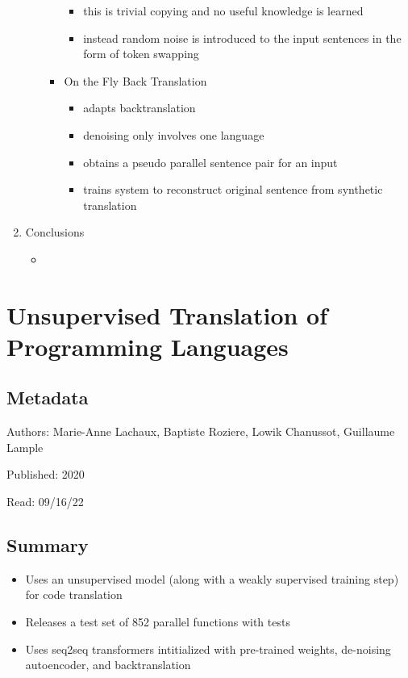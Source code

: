 \documentclass{article}
\begin{document}
\begin{enumerate}
\begin{enumerate}
\begin{itemize}
\begin{itemize}
				\item this is trivial copying and no useful knowledge is learned
				\item instead random noise is introduced to the input sentences in the form of token swapping
			\end{itemize}
			\item On the Fly Back Translation
			\begin{itemize}
				\item adapts backtranslation
				\item denoising only involves one language
				\item obtains a pseudo parallel sentence pair for an input
				\item trains system to reconstruct original sentence from synthetic translation
			\end{itemize}
		\end{itemize}
	\end{enumerate}
	\item Conclusions
	\begin{itemize}
		\item 
	\end{itemize}
\end{enumerate}

\pagebreak


\section*{Unsupervised Translation of Programming Languages}

\subsection*{Metadata}

\noindent Authors: Marie-Anne Lachaux, Baptiste Roziere, Lowik Chanussot, Guillaume Lample

\noindent Published: 2020

\noindent Read: 09/16/22

\subsection*{Summary}
\begin{itemize}
	\item Uses an unsupervised model (along with a weakly supervised training step) for code translation
	\item Releases a test set of 852 parallel functions with tests
	\item Uses seq2seq transformers intitialized with pre-trained weights, de-noising autoencoder, and backtranslation
\end{itemize}
\end{document}
